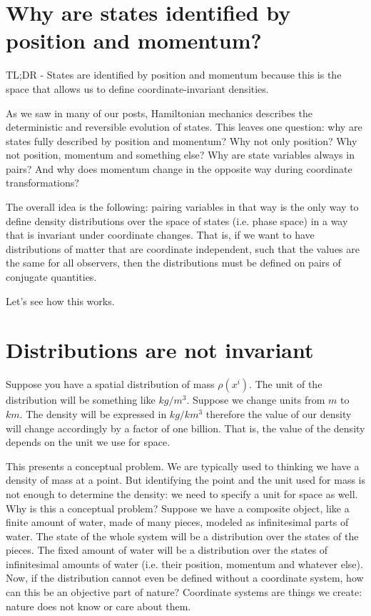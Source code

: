 \documentclass[aps,pra,10pt,floatfix,nofootinbib]{revtex4-1}
\theoremstyle{definition}
\begin{document}
\section{Why are states identified by position and momentum?}

TL;DR - States are identified by position and momentum because this is the space that allows us to define coordinate-invariant densities.

As we saw in many of our posts, Hamiltonian mechanics describes the deterministic and reversible evolution of states. This leaves one question: why are states fully described by position and momentum? Why not only position? Why not position, momentum and something else? Why are state variables always in pairs? And why does momentum change in the opposite way during coordinate transformations?

The overall idea is the following: pairing variables in that way is the only way to define density distributions over the space of states (i.e. phase space) in a way that is invariant under coordinate changes. That is, if we want to have distributions of matter that are coordinate independent, such that the values are the same for all observers, then the distributions must be defined on pairs of conjugate quantities.

Let's see how this works.

\section{Distributions are not invariant}

Suppose you have a spatial distribution of mass $\rho(x^i)$. The unit of the distribution will be something like $kg/m^3$. Suppose we change units from $m$ to $km$. The density will be expressed in $kg/km^3$ therefore the value of our density will change accordingly by a factor of one billion. That is, the value of the density depends on the unit we use for space.

This presents a conceptual problem. We are typically used to thinking we have a density of mass at a point. But identifying the point and the unit used for mass is not enough to determine the density: we need to specify a unit for space as well. Why is this a conceptual problem? Suppose we have a composite object, like a finite amount of water, made of many pieces, modeled as infinitesimal parts of water. The state of the whole system will be a distribution over the states of the pieces. The fixed amount of water will be a distribution over the states of infinitesimal amounts of water (i.e. their position, momentum and whatever else). Now, if the distribution cannot even be defined without a coordinate system, how can this be an objective part of nature? Coordinate systems are things we create: nature does not know or care about them.
\end{document}
